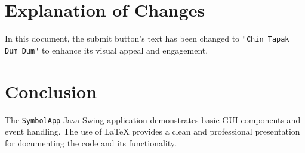\documentclass[12pt, a4paper]{article}
\begin{document}
\newpage 
{}

\section*{Explanation of Changes}
In this document, the submit button's text has been changed to \texttt{"Chin Tapak Dum Dum"} to enhance its visual appeal and engagement.
\section*{Conclusion}
The \texttt{SymbolApp} Java Swing application demonstrates basic GUI components and event handling. The use of LaTeX provides a clean and professional presentation for documenting the code and its functionality.\\
\newpage


\centering
\end{document}
